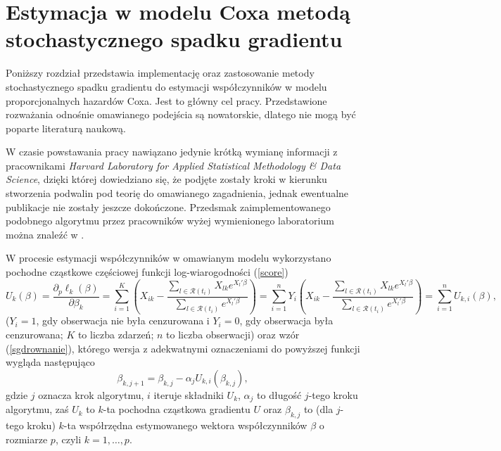 \chapter{Estymacja w modelu Coxa metodą stochastycznego spadku gradientu}\label{rozdz4}

Poniższy rozdział przedstawia implementację oraz zastosowanie metody stochastycznego spadku gradientu do estymacji współczynników w modelu proporcjonalnych hazardów Coxa. Jest to główny cel pracy. Przedstawione rozważania odnośnie omawianego podejścia są nowatorskie, dlatego nie mogą być poparte literaturą naukową.

W czasie powstawania pracy nawiązano jedynie krótką wymianę informacji z pracownikami \textit{Harvard Laboratory for Applied Statistical Methodology \& Data Science}, dzięki której dowiedziano się, że podjęte zostały kroki w kierunku stworzenia podwalin pod teorię do omawianego zagadnienia, jednak ewentualne publikacje nie zostały jeszcze dokończone. Przedsmak zaimplementowanego podobnego algorytmu przez pracowników wyżej wymienionego laboratorium można znaleźć w \cite{sgdpkg}.

W procesie estymacji współczynników w omawianym modelu wykorzystano pochodne cząstkowe częściowej funkcji log-wiarogodności (\ref{score})
\begin{equation*}
U_k(\beta)=\dfrac{\partial{}_{p}\ell_k(\beta)}{\partial\beta_k}=\sum\limits_{i=1}^{K}\left(X_{ik}-\dfrac{\sum\limits_{l\in \mathscr{R}(t_i)}^{} X_{lk} e^{X_l'\beta}}{\sum\limits_{l\in \mathscr{R}(t_i)}^{} e^{X_l'\beta}}\right)=\sum\limits_{i=1}^{n}Y_i\left(X_{ik}-\dfrac{\sum\limits_{l\in \mathscr{R}(t_i)}^{} X_{lk} e^{X_l'\beta}}{\sum\limits_{l\in \mathscr{R}(t_i)}^{} e^{X_l'\beta}}\right)=\sum\limits_{i=1}^{n}U_{k,i}(\beta),
\end{equation*}
($Y_i = 1$, gdy obserwacja nie była cenzurowana i $Y_i = 0$, gdy obserwacja była cenzurowana; $K$ to liczba zdarzeń; $n$ to liczba obserwacji) oraz wzór (\ref{sgdrownanie}), którego wersja z adekwatnymi oznaczeniami do powyższej funkcji wygląda następująco
\begin{equation}\label{opta}
\beta_{k,j+1} = \beta_{k,j} - \alpha_{j}U_{k,i}(\beta_{k,j}),
\end{equation}
gdzie $j$ oznacza krok algorytmu, $i$ iteruje składniki $U_{k}$, $\alpha_j$ to długość $j$-tego kroku algorytmu, zaś $U_{k}$ to $k$-ta pochodna cząstkowa gradientu $U$ oraz $\beta_{k,j}$ to (dla $j$-tego kroku) $k$-ta współrzędna estymowanego wektora współczynników $\beta$ o rozmiarze $p$, czyli $k=1,\dots,p$. 

